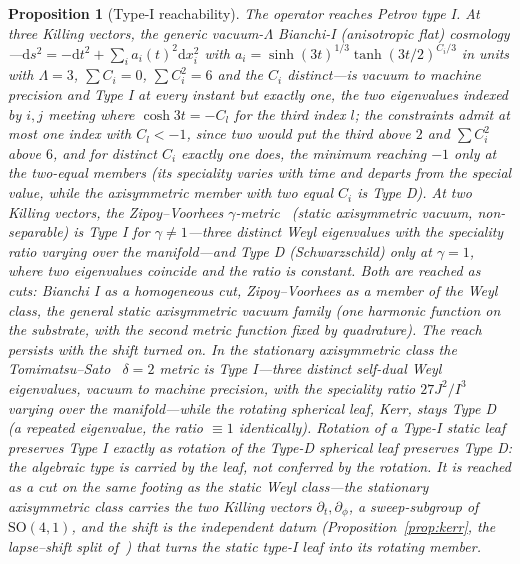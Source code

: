 \documentclass[11pt,a4paper]{article}
\newtheorem{proposition}[theorem]{Proposition}
\theoremstyle{definition}
\newcommand{\dd}{\mathrm{d}}
\newcommand{\so}{\mathrm{SO}(4,1)}
\begin{document}
\begin{proposition}[Type-I reachability]\label{prop:typeI}
The operator reaches Petrov type I. At three Killing vectors, the generic vacuum-$\Lambda$ Bianchi-I (anisotropic flat) cosmology---$\dd s^{2}=-\dd t^{2}+\sum_{i}a_{i}(t)^{2}\dd x_{i}^{2}$ with $a_{i}=\sinh(3t)^{1/3}\tanh(3t/2)^{C_{i}/3}$ in units with $\Lambda=3$, $\sum C_{i}=0$, $\sum C_{i}^{2}=6$ and the $C_{i}$ distinct---is vacuum to machine precision and Type I at every instant but exactly one, the two eigenvalues indexed by $i,j$ meeting where $\cosh3t=-C_{l}$ for the third index $l$; the constraints admit at most one index with $C_{l}<-1$, since two would put the third above $2$ and $\sum C_{i}^{2}$ above $6$, and for distinct $C_{i}$ exactly one does, the minimum reaching $-1$ only at the two-equal members (its speciality varies with time and departs from the special value, while the axisymmetric member with two equal $C_{i}$ is Type D). At two Killing vectors, the Zipoy--Voorhees $\gamma$-metric~\cite{Zipoy1966,Voorhees1970} (static axisymmetric vacuum, non-separable) is Type I for $\gamma\neq1$---three distinct Weyl eigenvalues with the speciality ratio varying over the manifold---and Type D (Schwarzschild) only at $\gamma=1$, where two eigenvalues coincide and the ratio is constant. Both are reached as cuts: Bianchi I as a homogeneous cut, Zipoy--Voorhees as a member of the Weyl class, the general static axisymmetric vacuum family (one harmonic function on the substrate, with the second metric function fixed by quadrature). The reach persists with the shift turned on. In the \emph{stationary} axisymmetric class the Tomimatsu--Sato~\cite{TomimatsuSato1972} $\delta=2$ metric is Type I---three distinct self-dual Weyl eigenvalues, vacuum to machine precision, with the speciality ratio $27J^{2}/I^{3}$ varying over the manifold---while the rotating \emph{spherical} leaf, Kerr, stays Type D (a repeated eigenvalue, the ratio $\equiv1$ identically). Rotation of a Type-I static leaf preserves Type I exactly as rotation of the Type-D spherical leaf preserves Type D: the algebraic type is carried by the leaf, not conferred by the rotation. It is reached as a cut on the same footing as the static Weyl class---the stationary axisymmetric class carries the two Killing vectors $\partial_{t},\partial_{\phi}$, a sweep-subgroup of $\so$, and the shift is the independent datum (Proposition~\ref{prop:kerr}, the lapse--shift split of~\cite{JanzenOperator}) that turns the static type-I leaf into its rotating member.
\end{proposition}
\end{document}
